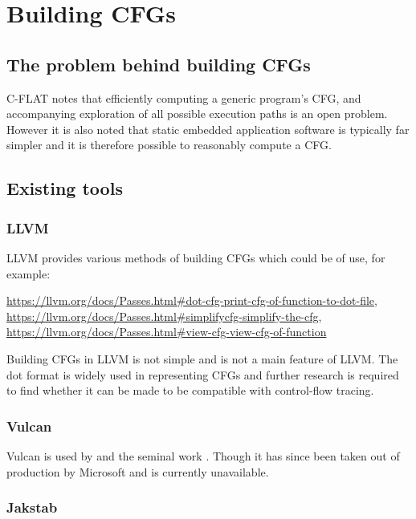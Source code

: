 \section{Building CFGs}

\subsection{The problem behind building CFGs}

C-FLAT \cite{Abera2016} notes that efficiently computing a generic program's CFG, and accompanying exploration of all possible execution paths is an open problem. However it is also noted that static embedded application software is typically far simpler and it is therefore possible to reasonably compute a CFG.

\subsection{Existing tools}

\subsubsection*{LLVM}

LLVM provides various methods of building CFGs which could be of use, for example:

\url{https://llvm.org/docs/Passes.html#dot-cfg-print-cfg-of-function-to-dot-file},\\
\url{https://llvm.org/docs/Passes.html#simplifycfg-simplify-the-cfg},\\
\url{https://llvm.org/docs/Passes.html#view-cfg-view-cfg-of-function}

Building CFGs in LLVM is not simple and is not a main feature of LLVM. The dot format is widely used in representing CFGs and further research is required to find whether it can be made to be compatible with control-flow tracing.

\subsubsection*{Vulcan}

Vulcan \cite{Edwards2001} is used by \cite{Davi2012} and the seminal work \cite{Abadi2005}. Though it has since been taken out of production by Microsoft and is currently unavailable.

\subsubsection*{Jakstab}

